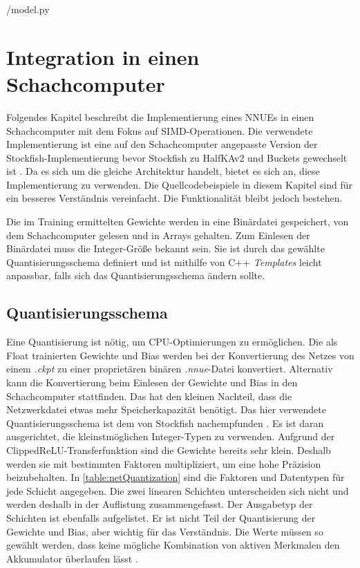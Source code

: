 
{\srcloc/model.py}

\section{Integration in einen Schachcomputer}
\label{chap:integration}

Folgendes Kapitel beschreibt die Implementierung eines \acp{NNUE} in einen Schachcomputer mit dem Fokus auf \ac{SIMD}-Operationen. Die verwendete Implementierung ist eine auf den Schachcomputer angepasste Version der Stockfish-Implementierung bevor Stockfish zu HalfKAv2 und Buckets gewechselt ist \cite{StockfishRepo}. Da es sich um die gleiche Architektur handelt, bietet es sich an, diese Implementierung zu verwenden. Die Quellcodebeispiele in diesem Kapitel sind für ein besseres Verständnis vereinfacht. Die Funktionalität bleibt jedoch bestehen.

Die im Training ermittelten Gewichte werden in eine Binärdatei gespeichert, von dem Schachcomputer gelesen und in Arrays gehalten. Zum Einlesen der Binärdatei muss die Integer-Größe bekannt sein. Sie ist durch das gewählte Quantisierungsschema definiert und ist mithilfe von C++ \emph{Templates} leicht anpassbar, falls sich das Quantisierungsschema ändern sollte.

\subsection{Quantisierungsschema}

Eine Quantisierung ist nötig, um CPU-Optimierungen zu ermöglichen. Die als Float trainierten Gewichte und Bias werden bei der Konvertierung des Netzes von einem \emph{.ckpt} zu einer proprietären binären \emph{.nnue}-Datei konvertiert. Alternativ kann die Konvertierung beim Einlesen der Gewichte und Bias in den Schachcomputer stattfinden. Das hat den kleinen Nachteil, dass die Netzwerkdatei etwas mehr Speicherkapazität benötigt. Das hier verwendete Quantisierungsschema ist dem von Stockfish nachempfunden \cite{StockfishNNUE}. Es ist daran ausgerichtet, die kleinstmöglichen Integer-Typen zu verwenden. Aufgrund der Clipped\ac{ReLU}-Transferfunktion sind die Gewichte bereits sehr klein. Deshalb werden sie mit bestimmten Faktoren multipliziert, um eine hohe Präzision beizubehalten. In \autoref{table:netQuantization} sind die Faktoren und Datentypen für jede Schicht angegeben. Die zwei linearen Schichten unterscheiden sich nicht und werden deshalb in der Auflistung zusammengefasst. Der Ausgabetyp der Schichten ist ebenfalls aufgelistet. Er ist nicht Teil der Quantisierung der Gewichte und Bias, aber wichtig für das Verständnis. Die Werte müssen so gewählt werden, dass keine mögliche Kombination von aktiven Merkmalen den Akkumulator überlaufen lässt \cite{StockfishNNUE}.

